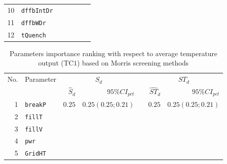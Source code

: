 \begin{table*}[!ht]
\begin{tabular*}{\textwidth}{@{}rlrrrrr@{}}
\footnotesize{10}  & \footnotesize{\texttt{dffbIntDr}}  &                        &                                 &&                         &    \\
\footnotesize{11}  & \footnotesize{\texttt{dffbWDr}}    &                        &                                 &&                         &    \\
\footnotesize{12}  & \footnotesize{\texttt{tQuench}}    &                        &                                 &&                         &    \\
\bottomrule
\end{tabular*}
\end{table*}

\begin{table*}[!ht]\centering
{}
\caption{Parameters importance ranking with respect to average temperature output (TC$1$) based on Morris screening methods}
\begin{tabular*}{\textwidth}{@{}rlrrrrr@{}}\toprule
\multirow{2}{*}{\footnotesize{No.}}&\multirow{2}{*}{\footnotesize{Parameter}}&\multicolumn{2}{c}{\footnotesize{$S_d$}}&\phantom{a}&\multicolumn{2}{c}{\footnotesize{$ST_d$}}\\             
                                                                              \cmidrule{3-4}                                       \cmidrule{6-7}
                                   &                                         &\footnotesize{$\hat{S}_d$}&\footnotesize{$95\%CI_{pct}$}&&\footnotesize{$\hat{ST}_d$}&\footnotesize{$95\%CI_{pct}$} \\ \midrule
\footnotesize{1}   & \footnotesize{\texttt{breakP}}     &  \footnotesize{$0.25$} &\footnotesize{$0.25 (0.25;0.21)$}&& \footnotesize{$0.25$}   &   \footnotesize{$0.25 (0.25;0.21)$}   \\
\footnotesize{2}   & \footnotesize{\texttt{fillT}}     	&                        &                                 &&                         &    \\
\footnotesize{3}   & \footnotesize{\texttt{fillV}}     	&                        &                                 &&                         &    \\
\footnotesize{4}   & \footnotesize{\texttt{pwr}}       	&                        &                                 &&                         &    \\
\footnotesize{5}   & \footnotesize{\texttt{GridHT}}     &                        &                                 &&                         &    \\

\end{tabular*}
\end{table*}
